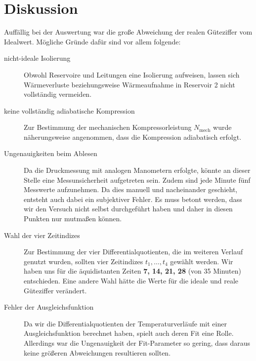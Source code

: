 \section{Diskussion}
Auffällig bei der Auswertung war die große Abweichung der realen Güteziffer vom Idealwert. Mögliche Gründe dafür sind vor allem folgende:
\begin{description}
  \item[nicht-ideale Isolierung]
  Obwohl Reservoire und Leitungen eine Isolierung aufweisen,
  lassen sich Wärmeverluste beziehungsweise Wärmeaufnahme in Reservoir 2 nicht vollständig vermeiden.

  \item[keine vollständig adiabatische Kompression]
  Zur Bestimmung der mechanischen Kompressorleistung $N_\text{mech}$ wurde näherungsweise angenommen,
  dass die Kompression adiabatisch erfolgt.

  \item[Ungenauigkeiten beim Ablesen]
  Da die Druckmessung mit analogen Manometern erfolgte,
  könnte an dieser Stelle eine Messunsicherheit aufgetreten sein.
  Zudem sind jede Minute fünf Messwerte aufzunehmen.
  Da dies manuell und nacheinander geschieht,
  entsteht auch dabei ein subjektiver Fehler.
  Es muss betont werden,
  dass wir den Versuch nicht selbst durchgeführt haben und daher in diesen Punkten nur mutmaßen können.

  \item[Wahl der vier Zeitindizes] Zur Bestimmung der vier Differentialquotienten, die im weiteren Verlauf genutzt wurden, sollten vier Zeitindizes $t_1, \ldots, t_4$ gewählt werden. Wir haben uns für die äquidistanten Zeiten \textbf{7, 14, 21, 28} (von 35 Minuten) entschieden. Eine andere Wahl hätte die Werte für die ideale und reale Güteziffer verändert.

  \item[Fehler der Ausgleichsfunktion]
  Da wir die Differentialquotienten der Temperaturverläufe mit einer Ausgleichsfunktion berechnet haben, spielt auch deren Fit eine Rolle. Allerdings war die Ungenauigkeit der Fit-Parameter so gering, dass daraus keine größeren Abweichungen resultieren sollten.
\end{description}

\printbibliography


